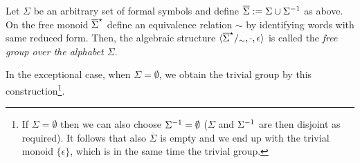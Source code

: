 \begin{definition}
\label{dfn_FreeGroup}
Let $\Sigma$ be an arbitrary set of formal symbols and define $\overline{\Sigma} := \Sigma \cup {\Sigma}^{-1}$ as above. On the free monoid ${\overline{\Sigma}}^{\star}$ define an equivalence relation $\sim$ by identifying words with same reduced form. Then, the algebraic structure $\langle {\overline{\Sigma}}^{\star}/_{\sim}, \cdot, \epsilon \rangle$ is called the \emph{free group over the alphabet $\Sigma$}.
\end{definition}

\begin{remark}
In the exceptional case, when $\Sigma = \emptyset$,  we obtain the trivial group by this construction\footnote{If $\Sigma = \emptyset$ then we can also choose ${\Sigma}^{-1} = \emptyset$ ($\Sigma$ and ${\Sigma}^{-1}$ are then disjoint as required). It follows that also $\overline{\Sigma}$ is empty and we end up with the trivial monoid $\{\epsilon\}$, which is in the same time the trivial group.}.
\end{remark}

